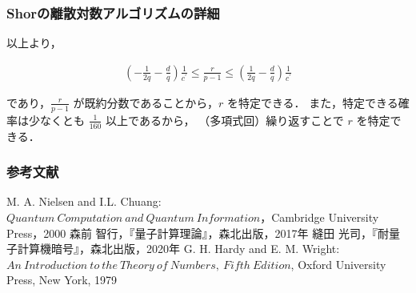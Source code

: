 \documentclass[dvipdfmx,12pt]{beamer}
\begin{document}
\begin{frame}
    
\frametitle{Shorの離散対数アルゴリズムの詳細}

以上より，\vspace{-10pt}

\begin{align*}
    \displaystyle \left( - \frac{1}{2 q} - \frac{d}{q} \right) \frac{1}{c^{\prime}} \leq \frac{r}{p - 1} \leq \left( \frac{1}{2 q} - \frac{d}{q} \right) \frac{1}{c^{\prime}}
\end{align*}

であり，$ \frac{r}{p - 1} $ が既約分数であることから，$r$ を特定できる．
また，特定できる確率は少なくとも $ \frac{1}{160} $ 以上であるから，
（多項式回）繰り返すことで $r$ を特定できる．
    
\end{frame}


\begin{frame}

\frametitle{参考文献}

\begin{thebibliography}{9}
  \beamertemplatetextbibitems
  M. A. Nielsen and I.L. Chuang: $Quantum \ Computation \ and \ Quantum \ Information$，Cambridge University Press，2000
  森前 智行，『量子計算理論』，森北出版，2017年
  縫田 光司，『耐量子計算機暗号』，森北出版，2020年
  G. H. Hardy and E. M. Wright: $ An \ Introduction \ to \ the \ Theory \ of \ Numbers, \ Fifth \ Edition $, Oxford University Press, New York, 1979
\end{thebibliography}

\end{frame}
\end{document}
